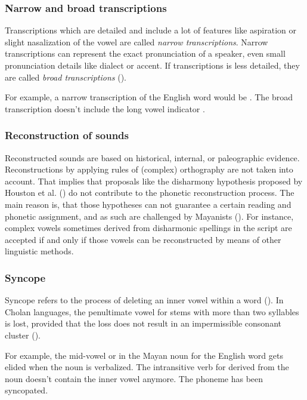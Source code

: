\documentclass[../main.tex]{subfiles}
\begin{document}
\subsubsection{Narrow and broad transcriptions}
Transcriptions which are detailed and include a lot of features like aspiration or 
slight nasalization of the vowel are called \emph{narrow transcriptions}.
Narrow transcriptions can represent the exact pronunciation of a speaker, even small pronunciation 
details like dialect or accent. 
If transcriptions is less detailed, 
they are called \emph{broad transcriptions} (\cite[490]{crystal2008}).

For example, a narrow transcription of the English word  would be 
.
The broad transcription  doesn't include 
the long vowel indicator \textipa{:}.

\subsubsection{Reconstruction of sounds}
Reconstructed sounds are based on historical, internal, or paleographic evidence.
Reconstructions by applying rules of (complex) orthography are not taken into account.
That implies that proposals like the disharmony hypothesis proposed by 
Houston et al. (\cites{lacadena2004}{houstonstuartrobertson1998}) do not contribute to the
phonetic reconstruction process.
The main reason is, that those hypotheses can not guarantee a certain reading and phonetic
assignment, and as such are challenged by Mayanists (\cite[7]{boot2009}).
For instance, complex vowels sometimes derived from disharmonic spellings in the script are
accepted if and only if those vowels can be reconstructed by means of other linguistic methods.

\subsubsection{Syncope}
Syncope refers to the process of deleting an inner vowel within a word (\cite[469]{crystal2008}).
In Ch\glottalstop{}olan languages, the penultimate vowel for stems with more than two syllables 
is lost, provided that the loss does not result in an impermissible 
consonant cluster (\cite[86]{kaufman1984}).

For example, the mid-vowel  or  in the Mayan noun 
for the English word  gets elided when the noun is verbalized.
The intransitive verb  for  derived from the 
noun  doesn't contain the inner vowel anymore.
The phoneme has been syncopated.
\end{document}
